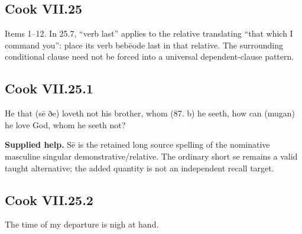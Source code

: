 \subsection*{Cook VII.25}

Items 1–12. In 25.7, “verb last” applies to the relative translating “that which I command you”: place its verb bebēode last in that relative. The surrounding conditional clause need not be forced into a universal dependent-clause pattern.

\par\begin{minipage}{\linewidth}\raggedright
\subsection*{Cook VII.25.1}

He that (sē ðe) loveth not his brother, whom (87. b) he seeth, how can (mugan) he love God, whom he seeth not?

\textbf{Supplied help.} Sē is the retained long source spelling of the nominative masculine singular demonstrative/\allowbreak{}relative. The ordinary short se remains a valid taught alternative; the added quantity is not an independent recall target.

\end{minipage}\par\addvspace{4pt}

\par\begin{minipage}{\linewidth}\raggedright
\subsection*{Cook VII.25.2}

The time of my departure is nigh at hand.

\end{minipage}\par\addvspace{4pt}

